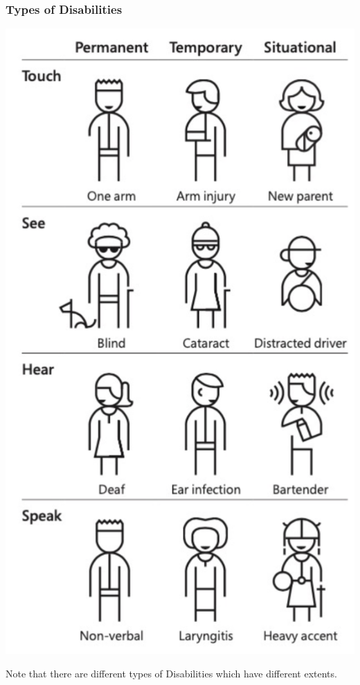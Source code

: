 \subsubsection{Types of Disabilities}
\begin{center}
    \includegraphics[scale=0.8]{lectures/wk13/img/disability_types.png}
\end{center}
Note that there are different types of Disabilities which have different extents. 

